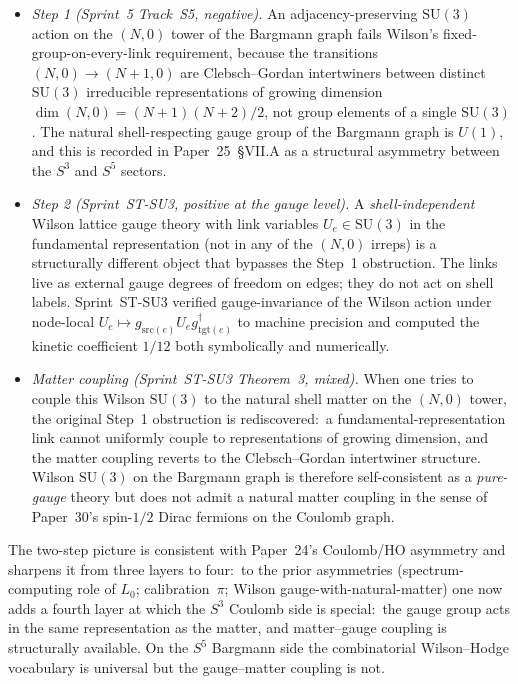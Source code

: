 \documentclass[11pt]{article}
\begin{document}
\begin{itemize}\setlength{\itemsep}{2pt}
\item \emph{Step 1 (Sprint~5 Track~S5, negative).}  An
adjacency-preserving $\mathrm{SU}(3)$ action on the $(N, 0)$ tower of
the Bargmann graph fails Wilson's fixed-group-on-every-link
requirement, because the transitions $(N, 0) \to (N+1, 0)$ are
Clebsch--Gordan intertwiners between distinct $\mathrm{SU}(3)$
irreducible representations of growing dimension $\dim(N, 0) =
(N+1)(N+2)/2$, not group elements of a single $\mathrm{SU}(3)$.  The
natural shell-respecting gauge group of the Bargmann graph is
$U(1)$, and this is recorded in Paper~25~\S VII.A as a structural
asymmetry between the $S^3$ and $S^5$ sectors.
\item \emph{Step 2 (Sprint~ST-SU3, positive at the gauge level).}  A
\emph{shell-independent} Wilson lattice gauge theory with link
variables $U_e \in \mathrm{SU}(3)$ in the fundamental representation
(not in any of the $(N, 0)$ irreps) is a structurally different
object that bypasses the Step~1 obstruction.  The links live as
external gauge degrees of freedom on edges; they do not act on
shell labels.  Sprint~ST-SU3 verified gauge-invariance of the
Wilson action under node-local
$U_e \mapsto g_{\mathrm{src}(e)} U_e g_{\mathrm{tgt}(e)}^{\dagger}$
to machine precision and computed the kinetic coefficient $1/12$
both symbolically and numerically.
\item \emph{Matter coupling (Sprint~ST-SU3 Theorem~3, mixed).}  When
one tries to couple this Wilson $\mathrm{SU}(3)$ to the natural
shell matter on the $(N, 0)$ tower, the original Step~1 obstruction
is rediscovered:\ a fundamental-representation link cannot uniformly
couple to representations of growing dimension, and the matter
coupling reverts to the Clebsch--Gordan intertwiner structure.
Wilson $\mathrm{SU}(3)$ on the Bargmann graph is therefore
self-consistent as a \emph{pure-gauge} theory but does not admit a
natural matter coupling in the sense of Paper~30's spin-$1/2$
Dirac fermions on the Coulomb graph.
\end{itemize}

The two-step picture is consistent with Paper~24's Coulomb/HO
asymmetry and sharpens it from three layers to four:\ to the prior
asymmetries (spectrum-computing role of $L_0$; calibration~$\pi$;
Wilson gauge-with-natural-matter) one now adds a fourth layer at
which the $S^3$ Coulomb side is special:\ the gauge group acts in
the same representation as the matter, and matter--gauge coupling
is structurally available.  On the $S^5$ Bargmann side the
combinatorial Wilson--Hodge vocabulary is universal but the
gauge--matter coupling is not.
\end{document}
